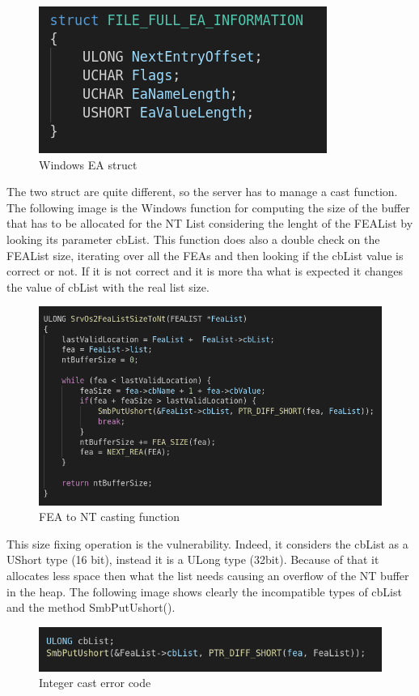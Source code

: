 \begin{figure}[ht!]
  \centering
    \includegraphics[scale=0.5]{images/windows_ea_struct.png}
    \caption{Windows EA struct}
\end{figure}
\noindent The two struct are quite different, so the server has to manage a cast function.\\
\noindent The following image is the Windows function for computing the size of the buffer that has to be allocated for the NT List considering
the lenght of the FEAList by looking its parameter cbList.
This function does also a double check on the FEAList size, iterating over all the FEAs and then looking if the cbList value is correct or not.
If it is not correct and it is more tha what is expected it changes the value of cbList with the real list size.

\begin{figure}[ht!]
  \centering
    \includegraphics[scale=0.5]{images/SrvOs2FeaListSizeToNt.png}
    \caption{FEA to NT casting function}
\end{figure}

\noindent This size fixing operation is the vulnerability.
Indeed, it considers the cbList as a UShort type (16 bit), instead it is a ULong type (32bit).
Because of that it allocates less space then what the list needs causing an overflow of the NT buffer in the heap\cite{exploit-db}.
The following image shows clearly the incompatible types of cbList and the method SmbPutUshort().
\begin{figure}[ht!]
  \centering
    \includegraphics[scale=0.5]{images/vulnerable_lines.png}
    \caption{Integer cast error code}
\end{figure}

